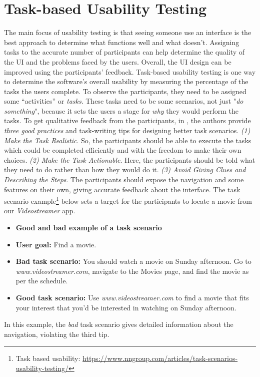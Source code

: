 \section{Task-based Usability Testing}
\label{background:section:task}
The main focus of usability testing is that seeing someone use an interface is the best approach to determine what functions well and what doesn't. 
Assigning tasks to the accurate number of participants can help determine the quality of the UI and the problems faced by the users. 
Overall, the UI design can be improved using the participants' feedback. 
Task-based usability testing is one way to determine the software's overall usability \cite{article:usability:doesburg} by measuring the percentage of the tasks the users complete.
To observe the participants, they need to be assigned some ``activities'' or \textit{tasks}. 
These tasks need to be some scenarios, not just "\textit{do something}", because it sets the users a stage for \textit{why} they would perform the tasks. 
To get qualitative feedback from the participants, in \cite{misc:usability:tasks}, the authors provide \textit{three good practices} and task-writing tips for designing better task scenarios.
\textit{(1) Make the Task Realistic}.
So, the participants should be able to execute the tasks which could be completed efficiently and with the freedom to make their own choices.
\textit{(2) Make the Task Actionable}.
Here, the participants should be told what they need to do rather than how they would do it.
\textit{(3) Avoid Giving Clues and Describing the Steps}.
The participants should expose the navigation and some features on their own, giving accurate feedback about the interface.
The task scenario example\footnote{Task based usability: \url{https://www.nngroup.com/articles/task-scenarios-usability-testing/}} below sets a target for the participants to locate a movie from our \textit{Videostreamer} app.
\begin{itemize}
  \item[] \textbf{Good and bad example of a task scenario}
  \item \textbf{User goal:} Find a movie. 
  \item \textbf{Bad task scenario:} You should watch a movie on Sunday afternoon. Go to\\ \textit{www.videostreamer.com}, navigate to the Movies page, and find the movie as per the schedule.
  \item \textbf{Good task scenario:} Use \textit{www.videostreamer.com} to find a movie that fits your interest that you'd be interested in watching on Sunday afternoon. 
\end{itemize}
In this example, the \textit{bad} task scenario gives detailed information about the navigation, violating the third tip.
\clearpage
